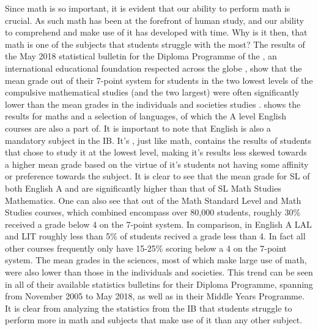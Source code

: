Since math is so important, it is evident that our ability to perform math is crucial. As such math has been at the forefront of human study, and our ability to comprehend and make use of it has developed with time. Why is it then, that math is one of the subjects that students struggle with the most?
\newline\newline
The results of the May 2018 statistical bulletin for the Diploma Programme of the , an international educational foundation respected across the globe \cite{WhatBaccalaureate}, show that the mean grade out of their 7-point system for students in the two lowest levels of the compulsive mathematical studies (and the two largest) were often significantly lower than the mean grades in the individuals and societies studies \cite{Baccalaureate2018TheSession}.  shows the results for maths and a selection of languages, of which the A level English courses are also a part of. It is important to note that English is also a mandatory subject in the IB. It's , just like math, contains the results of students that chose to study it at the lowest level, making it's results less skewed towards a higher mean grade based on the virtue of it's students not having some affinity or preference towards the subject. It is clear to see that the mean grade for SL of both English A  and  are significantly higher than that of SL Math Studies Mathematics. One can also see that out of the Math Standard Level and Math Studies courses, which combined encompass over 80,000 students, roughly 30\% received a grade below 4 on the 7-point system. In comparison, in English A LAL and LIT roughly less than 5\% of students recived a grade less than 4. In fact all other courses frequently only have 15-25\% scoring below a 4 on the 7-point system. The mean grades in the sciences, most of which make large use of math, were also lower than those in the individuals and societies. This trend can be seen in all of their available statistics bulletins for their Diploma Programme, spanning from November 2005 to May 2018, as well as in their Middle Years Programme. It is clear from analyzing the statistics from the IB that students struggle to perform more in math and subjects that make use of it than any other subject.

